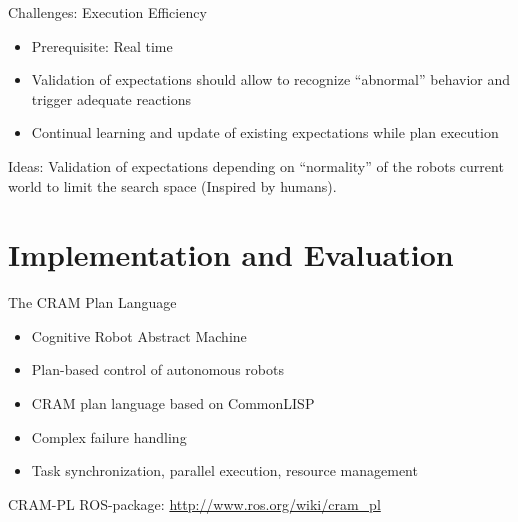 \documentclass{beamer}
\begin{document}
\begin{frame}{Challenges: Execution Efficiency}
  \begin{itemize}
  \item Prerequisite: Real time
  \item Validation of expectations should allow to recognize ``abnormal'' behavior and trigger adequate reactions
  \item Continual learning and update of existing expectations while plan execution
  \end{itemize}
  \begin{block}{Ideas:}
    Validation of expectations depending on ``normality'' of the robots current world to limit the search space (Inspired by humans).
  \end{block}
\end{frame}

\section{Implementation and Evaluation}

\label{sec:cram}

\begin{frame}{The CRAM Plan Language}
  \begin{itemize}
  \item Cognitive Robot Abstract Machine
  \item Plan-based control of autonomous robots
  \item CRAM plan language based on CommonLISP
  \item Complex failure handling
  \item Task synchronization, parallel execution, resource management
  \end{itemize}
  \begin{block}{CRAM-PL ROS-package:}
      \centering
      \url{http://www.ros.org/wiki/cram_pl}
  \end{block}
\end{frame} 
\end{document}
